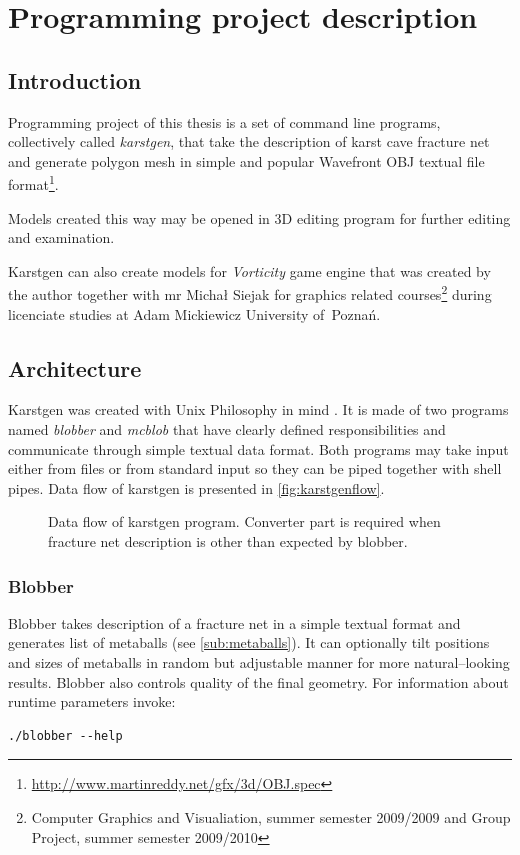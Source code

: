 \chapter{Programming project description}
\label{chap:project}
\section{Introduction}

Programming project of this thesis is a set of command line programs, collectively
called \emph{karstgen}, that take
the description of karst cave fracture net and generate polygon mesh in
simple and popular Wavefront OBJ textual file format\footnote{\url{http://www.martinreddy.net/gfx/3d/OBJ.spec}}.

Models created this way may be opened in 3D editing program for further editing
and examination.

Karstgen can also create models for \emph{Vorticity} game engine that was created
by the author together with mr Michał Siejak for graphics related courses\footnote{Computer
  Graphics and Visualiation, summer semester 2009/2009 and Group Project, summer
semester 2009/2010} during licenciate studies at Adam Mickiewicz University of~Poznań.

\section{Architecture}

Karstgen was created with Unix Philosophy in mind \parencite{raymond2003art}.
It is made of two programs named \emph{blobber} and \emph{mcblob} that have
clearly defined responsibilities and communicate through simple textual data
format.  Both programs may take input either from files or from standard input
so they can be piped together with shell pipes. Data flow of karstgen is
presented in \autoref{fig:karstgenflow}.
\begin{figure}[ht]
  \begin{center}
    
  \end{center}
  \caption{Data flow of karstgen program. Converter part is required when fracture
  net description is other than expected by blobber.}
  \label{fig:karstgenflow}
\end{figure}

\subsection{Blobber}
Blobber takes description of a fracture net in a simple textual format and
generates list of metaballs (see \autoref{sub:metaballs}). It can
optionally tilt positions and sizes of metaballs in random but adjustable manner
for more natural--looking results. Blobber also controls quality of the final
geometry. For information about runtime parameters invoke:
\begin{verbatim}
./blobber --help
\end{verbatim}

